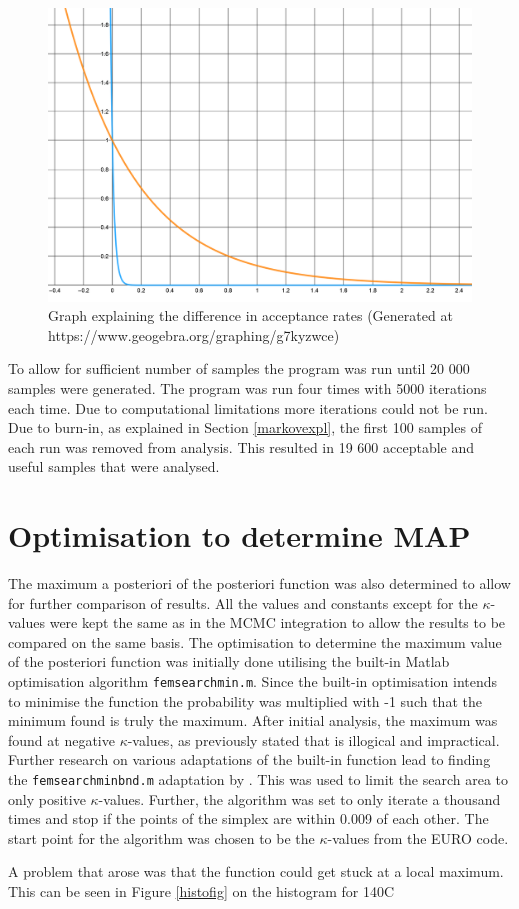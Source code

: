 	\begin{figure}[H]\label{expcurvefig}
	\centering
	\includegraphics[width = 0.5\linewidth]{figures/e_expl_curve.png}
	\caption{Graph explaining the difference in acceptance rates (Generated at https://www.geogebra.org/graphing/g7kyzwce)}
	\end{figure}
	
	To allow for sufficient number of samples the program was run until 20 000 samples were generated.
	The program was run four times with 5000 iterations each time. 
	Due to computational limitations more iterations could not be run.
	Due to burn-in, as explained in Section \ref{markovexpl}, the first 100 samples of each run was removed from analysis. 
	This resulted in 19 600 acceptable and useful samples that were analysed.
	
	
	\section{Optimisation to determine MAP}
The maximum a posteriori of the posteriori function was also determined to allow for further comparison of results.
All the values and constants except for the $\kappa$-values were kept the same as in the MCMC integration to allow the results to be compared on the same basis.  
	The optimisation to determine the maximum value of the posteriori function was initially done utilising the built-in Matlab optimisation algorithm \texttt{femsearchmin.m}. 
	Since the built-in optimisation intends to minimise the function the probability was multiplied with -1 such that the minimum found is truly the maximum.
	After initial analysis, the maximum was found at negative $\kappa$-values, as previously stated that is illogical and impractical.
	Further research on various adaptations of the built-in function lead to finding the \texttt{femsearchminbnd.m} adaptation by \citet{derrico:2021}. 
	This was used to limit the search area to only positive $\kappa$-values.
	Further, the algorithm was set to only iterate a thousand times and stop if the points of the simplex are within 0.009 of each other.
	The start point for the algorithm was chosen to be the $\kappa$-values from the EURO code.
	
	A problem that arose was that the function could get stuck at a local maximum.
	This can be seen in Figure \ref{histofig} on the histogram for 140\textdegree C
	
	
